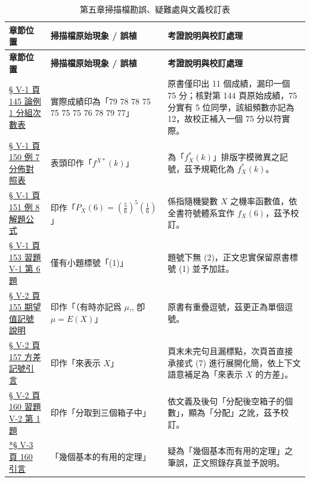 \documentclass[a4paper,12pt,twoside]{article}
\begin{document}
\small
\renewcommand{\arraystretch}{1.35}
\begin{xltabular}{\textwidth}{|p{3.2cm}|p{3.8cm}|X|}
\caption{第五章掃描檔勘誤、疑難處與文義校訂表}\label{tab:errata_b5_ch5} \\
\hline
\textbf{章節位置} & \textbf{掃描檔原始現象 / 誤植} & \textbf{考證說明與校訂處理} \\ \hline
\endfirsthead
\hline
\textbf{章節位置} & \textbf{掃描檔原始現象 / 誤植} & \textbf{考證說明與校訂處理} \\ \hline
\endhead
\hline
\endfoot

\hyperref[note:b5-ch5-p145-75]{§ V-1 頁 145 論例 1 分組次數表} & 
實際成績印為「79 78 78 75 75 75 75 76 78 79 77」 & 
原書僅印出 11 個成績，漏印一個 75 分；核對第 144 頁原始成績，75 分實有 5 位同學，該組頻數亦記為 12，故校正補入一個 75 分以符實際。 \\ \hline

\hyperref[note:b5-ch5-p150-fxstar]{§ V-1 頁 150 例 7 分佈對照表} & 
表頭印作「$f^{X*}(k)$」 & 
為「$f_X^*(k)$」排版字模微異之記號，茲予規範化為 $f_X^*(k)$。 \\ \hline

\hyperref[note:b5-ch5-p151-px6]{§ V-1 頁 151 例 8 解題公式} & 
印作「$P_X(6) = \left(\frac{5}{6}\right)^5 \left(\frac{1}{6}\right)$」 & 
係指隨機變數 $X$ 之機率函數值，依全書符號體系宜作 $f_X(6)$，茲予校訂。 \\ \hline

\hyperref[note:b5-ch5-p153-q6]{§ V-1 頁 153 習題 V-1 第 6 題} & 
僅有小題標號「(1)」 & 
題號下無 (2)，正文忠實保留原書標號 (1) 並予加註。 \\ \hline

\hyperref[note:b5-ch5-p155-doubled-comma]{§ V-2 頁 155 期望值記號說明} & 
印作「（有時亦記爲 $\mu$,, 卽 $\mu=E(X)$」 & 
原書有重疊逗號，茲更正為單個逗號。 \\ \hline

\hyperref[note:b5-ch5-p157-fangcha]{§ V-2 頁 157 方差記號引言} & 
印作「來表示 $X$」 & 
頁末未完句且漏標點，次頁首直接承接式 (7) 進行展開化簡，依上下文語意補足為「來表示 $X$ 的方差」。 \\ \hline

\hyperref[note:b5-ch5-p160-fenpei]{§ V-2 頁 160 習題 V-2 第 1 題} & 
印作「分取到三個箱子中」 & 
依文義及後句「分配後空箱子的個數」，顯為「分配」之訛，茲予校訂。 \\ \hline

\hyperref[note:b5-ch5-p160-typo]{*§ V-3 頁 160 引言} & 
「幾個基本的有用的定理」 & 
疑為「幾個基本而有用的定理」之筆誤，正文照錄存真並予說明。 \\ \hline


\end{xltabular}
\end{document}
